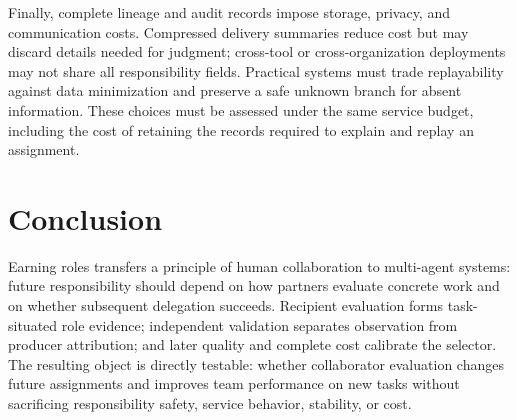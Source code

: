 \documentclass[sigconf,anonymous]{aamas}
\begin{document}
Finally, complete lineage and audit records impose storage, privacy, and communication costs. Compressed delivery summaries reduce cost but may discard details needed for judgment; cross-tool or cross-organization deployments may not share all responsibility fields. Practical systems must trade replayability against data minimization and preserve a safe unknown branch for absent information. These choices must be assessed under the same service budget, including the cost of retaining the records required to explain and replay an assignment.

\section{Conclusion}
Earning roles transfers a principle of human collaboration to multi-agent systems: future responsibility should depend on how partners evaluate concrete work and on whether subsequent delegation succeeds. Recipient evaluation forms task-situated role evidence; independent validation separates observation from producer attribution; and later quality and complete cost calibrate the selector. The resulting object is directly testable: whether collaborator evaluation changes future assignments and improves team performance on new tasks without sacrificing responsibility safety, service behavior, stability, or cost.

\clearpage


\end{document}
